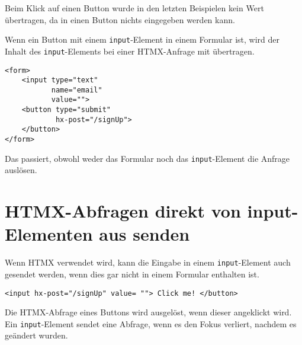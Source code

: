 \documentclass[a4paper]{scrartcl}
\begin{document}
Beim Klick auf einen Button wurde in den letzten Beispielen kein Wert übertragen, da in einen Button nichts eingegeben werden kann.

Wenn ein Button mit einem \texttt{input}-Element in einem Formular ist, wird der Inhalt des \texttt{input}-Elements bei einer HTMX-Anfrage mit übertragen.

\begin{verbatim}
<form>
    <input type="text"
           name="email"
           value="">
    <button type="submit"
            hx-post="/signUp">
    </button>
</form>
\end{verbatim}

Das passiert, obwohl weder das Formular noch das \texttt{input}-Element die Anfrage auslösen.
%
%
\section{HTMX-Abfragen direkt von input-Elementen aus senden}\label{sec:htmx-abfragen-direkt-von-input-elementen-aus-senden}

Wenn HTMX verwendet wird, kann die Eingabe in einem \texttt{input}-Element
auch gesendet werden, wenn dies gar nicht in einem Formular enthalten ist.


\begin{verbatim}
<input hx-post="/signUp" value= ""> Click me! </button>
\end{verbatim}

Die HTMX-Abfrage eines Buttons wird ausgelöst, wenn dieser angeklickt wird.
 Ein \texttt{input}-Element sendet eine Abfrage, wenn es den Fokus verliert, nachdem es geändert wurden.
\end{document}
